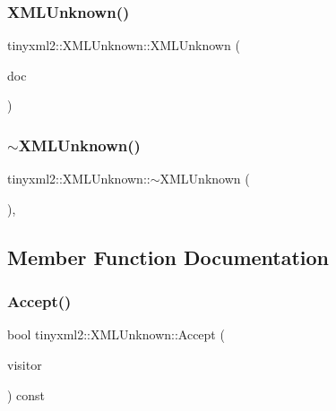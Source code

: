 \subsubsection{\texorpdfstring{X\+M\+L\+Unknown()}{XMLUnknown()}}
{\footnotesize\ttfamily tinyxml2\+::\+X\+M\+L\+Unknown\+::\+X\+M\+L\+Unknown (\begin{DoxyParamCaption}\item[{\hyperlink{classtinyxml2_1_1_x_m_l_document}{X\+M\+L\+Document} $\ast$}]{doc }\end{DoxyParamCaption})\hspace{0.3cm}{\ttfamily [protected]}}

\mbox{\label{classtinyxml2_1_1_x_m_l_unknown_a86fcd722ca173a7f385bafafa879f26e}} 
\subsubsection{\texorpdfstring{$\sim$\+X\+M\+L\+Unknown()}{~XMLUnknown()}}
{\footnotesize\ttfamily tinyxml2\+::\+X\+M\+L\+Unknown\+::$\sim$\+X\+M\+L\+Unknown (\begin{DoxyParamCaption}{ }\end{DoxyParamCaption})\hspace{0.3cm}{\ttfamily [protected]}, {\ttfamily [virtual]}}



\subsection{Member Function Documentation}
\mbox{\label{classtinyxml2_1_1_x_m_l_unknown_a8a06b8c82117ca969a432e17a46830fc}} 
\subsubsection{\texorpdfstring{Accept()}{Accept()}}
{\footnotesize\ttfamily bool tinyxml2\+::\+X\+M\+L\+Unknown\+::\+Accept (\begin{DoxyParamCaption}\item[{\hyperlink{classtinyxml2_1_1_x_m_l_visitor}{X\+M\+L\+Visitor} $\ast$}]{visitor }\end{DoxyParamCaption}) const\hspace{0.3cm}{\ttfamily [virtual]}}

